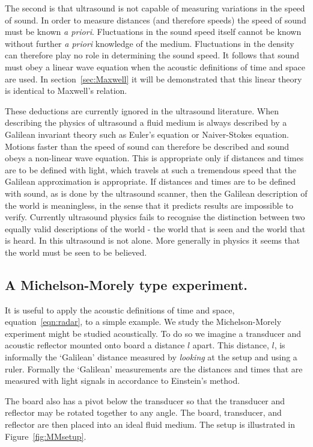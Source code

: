 \documentclass[10pt, fleqn,draft,showtrims,oldfontcommands]{article} %
\newcommand{\secref}[1]{section~\ref{sec:#1}}
\newcommand{\figref}[1]{Figure~\ref{fig:#1}}
\begin{document}
The second is that ultrasound is not capable of  measuring variations in the speed of sound.
In order to measure distances (and therefore speeds) the speed of sound must be known {\em a priori}.
Fluctuations in the sound speed itself cannot be known without further {\em a priori} knowledge of the medium. 
Fluctuations in the density  can therefore play no role in determining the sound speed. %
It follows that sound must obey a linear wave equation when the acoustic definitions of time and space are used.
In \secref{Maxwell} it will be demonstrated that this linear theory is identical to Maxwell's relation.


These deductions are currently ignored in the ultrasound literature.
When describing the physics of ultrasound a fluid medium is always described by a Galilean invariant theory such as Euler's equation or Naiver-Stokes equation.
Motions faster than the speed of sound can therefore be described and sound obeys a non-linear wave equation.
This is appropriate only if distances and times are to be defined with light, which travels at such a tremendous speed that the Galilean approximation is appropriate.
If distances and times are to be defined with sound, as is done by the ultrasound scanner,
then the Galilean description of the world is meaningless, in the sense that it predicts  results are impossible to verify.
Currently ultrasound physics fails to recognise the distinction between  two equally valid descriptions of the world -
the world that is seen
and the world that is heard.
In this ultrasound is not alone.
More generally in physics it seems that the world must be seen to be believed.

\subsection{A Michelson-Morely type experiment.}

It is useful to apply the acoustic definitions of time and space, equation~\ref{eqn:radar}, to a simple example.
We study the Michelson-Morely experiment might be studied acoustically.
To do so we imagine a transducer and acoustic reflector mounted onto board a distance $l$ apart.
This distance, $l$,  is informally  the `Galilean' distance measured by {\em looking} at the setup and using a ruler.
Formally the `Galilean' measurements are the distances and times that are  measured with light signals in accordance to Einstein's method.

The board also has a pivot below the transducer so that the transducer and reflector may  be rotated together to any angle.
The board, transducer, and reflector are then placed into an ideal fluid medium.
The setup is illustrated in \figref{MMsetup}.
\end{document}
